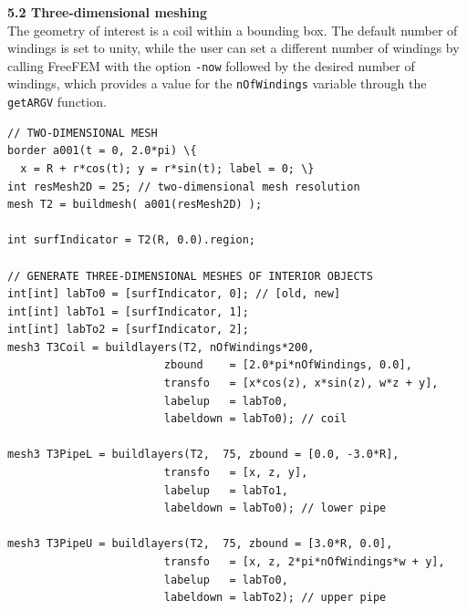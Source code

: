 \documentclass[9pt]{amsart}
\theoremstyle{remark}
\theoremstyle{definition}
\begin{document}
\vspace*{0.2cm}
\textbf{5.2 Three-dimensional meshing}\\
The geometry of interest is a coil within a bounding box. The default number of windings is set to unity, while the user can set a different number of windings by calling FreeFEM with the option \verb!-now! followed by the desired number of windings, which provides a value for the \verb!nOfWindings! variable through the \verb!getARGV! function.
\begin{Verbatim}[commandchars=\\\{\}]
// TWO-DIMENSIONAL MESH
border a001(t = 0, 2.0*pi) \{
  x = R + r*cos(t); y = r*sin(t); label = 0; \}
int resMesh2D = 25; // two-dimensional mesh resolution
mesh T2 = buildmesh( a001(resMesh2D) );

int surfIndicator = T2(R, 0.0).region;

// GENERATE THREE-DIMENSIONAL MESHES OF INTERIOR OBJECTS
int[int] labTo0 = [surfIndicator, 0]; // [old, new]
int[int] labTo1 = [surfIndicator, 1];
int[int] labTo2 = [surfIndicator, 2];
mesh3 T3Coil = buildlayers(T2, nOfWindings*200,
                        zbound    = [2.0*pi*nOfWindings, 0.0],
                        transfo   = [x*cos(z), x*sin(z), w*z + y],
                        labelup   = labTo0,
                        labeldown = labTo0); // coil

mesh3 T3PipeL = buildlayers(T2,  75, zbound = [0.0, -3.0*R],
                        transfo   = [x, z, y],
                        labelup   = labTo1,
                        labeldown = labTo0); // lower pipe

mesh3 T3PipeU = buildlayers(T2,  75, zbound = [3.0*R, 0.0],
                        transfo   = [x, z, 2*pi*nOfWindings*w + y],
                        labelup   = labTo0,
                        labeldown = labTo2); // upper pipe
\end{Verbatim}
\end{document}
